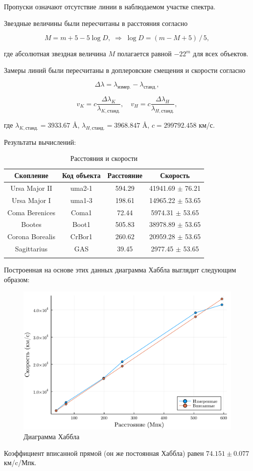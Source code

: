 \documentclass[a4paper, oneside]{article}
\newcommand{\npar}{\par\vspace{\baselineskip}}
\newcommand{\su}{\vspace{-0.5em}}
\newcommand{\sd}{\vspace{0.5em}}
\begin{document}
Пропуски означают отсутствие линии в наблюдаемом участке спектра. \npar

Звездные величины были пересчитаны в расстояния согласно

$$
M = m + 5 - 5 \log{D}, \; \Longrightarrow \; \log{D} = (m - M + 5) \, / \, 5,
$$
\su

где абсолютная звездная величина $M$ полагается равной $-22^m$ для всех объектов. \npar

Замеры линий были пересчитаны в доплеровские смещения и скорости согласно

$$
\Delta \lambda = \lambda_{\text{измер.}} - \lambda_{\text{станд.}},
$$
\su

\su\su
$$
v_K = c \frac{\Delta \lambda_K}{\lambda_{K, \text{станд.}}}, \quad
v_H = c \frac{\Delta \lambda_H}{\lambda_{H, \text{станд.}}},
$$
\sd

где $ \lambda_{K, \text{станд.}} = 3933.67 $ \AA, $ \lambda_{H, \text{станд.}} = 3968.847 $ \AA, $ c = 299792.458 $ км/с. \npar

\newpage

Результаты вычислений:

\begin{table}[h]
  \centering
  \caption{Расстояния и скорости}
  \begin{tabular}{cccc}
    \toprule
    Скопление &
    Код объекта &
    Расстояние &
    Скорость \\
    \midrule
    Ursa Major II & uma2-1 & 594.29 & 41941.69 $\pm$ 76.21 \\
    \arrayrulecolor{black!40}
    \midrule
    Ursa Major I & uma1-3 & 198.61 & 14965.22 $\pm$ 53.65 \\
    \midrule
    Coma Berenices & Coma1 & 72.44 & 5974.31 $\pm$ 53.65 \\
    \midrule
    Bootes & Boot1 & 505.83 & 38978.89 $\pm$ 53.65 \\
    \midrule
    Corona Borealis & CrBor1 & 260.62 & 20959.28 $\pm$ 53.65 \\
    \midrule
    Sagittarius & GAS & 39.45 & 2977.45 $\pm$ 53.65 \\
    \arrayrulecolor{black}
    \bottomrule
  \end{tabular}
\end{table}

Построенная на основе этих данных диаграмма Хаббла выглядит следующим образом:

\begin{figure}[h]
  \centering
  \includegraphics[scale=0.5]{result}
  \caption{Диаграмма Хаббла}
\end{figure}

Коэффициент вписанной прямой (он же постоянная Хаббла) равен $ 74.151 \pm 0.077 $ км/c/Мпк.
\end{document}
